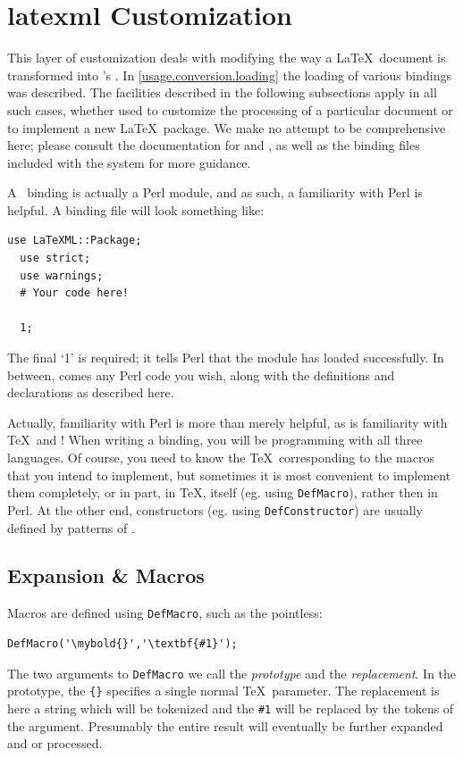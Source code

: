 \documentclass{book}
\newcommand{\ltxcode}{\lstinline[style=latexml]}
\begin{document}
\section{latexml Customization}\label{customization.latexml}
This layer of customization deals with modifying the way a \LaTeX\ document
is transformed into \LaTeXML's \XML.
In \ref{usage.conversion.loading} the loading of various bindings was
described.  The facilities described in the following subsections
apply in all such cases, whether used to customize the processing
of a particular document or to implement a new \LaTeX\ package.
We make no attempt to be comprehensive here; please consult
the documentation for  and ,
as well as the binding files included with the system
for more guidance.

A \LaTeXML\ binding is actually a Perl module, and as such, 
a familiarity with Perl is helpful.
A binding file will look something like:
\begin{lstlisting}[style=latexml]
  use LaTeXML::Package;
  use strict;
  use warnings;
  # Your code here!

  1;
\end{lstlisting}
The final `1' is required; it tells Perl that the module has loaded successfully.
In between, comes any Perl code you wish, along with the definitions
and declarations as described here.

Actually, familiarity with Perl is more than merely helpful, as is familiarity
with \TeX\ and \XML! When writing a binding, you will be programming with all
three languages.  Of course, you need to know the \TeX\ corresponding to
the macros that you intend to implement, but sometimes it is most convenient
to implement them completely, or in part, in \TeX, itself (eg. using \ltxcode|DefMacro|),
rather then in Perl. At the other end, constructors (eg. using \ltxcode|DefConstructor|)
are usually defined by patterns of \XML.

\subsection[Expansion]{Expansion \& Macros}\label{customization.latexml.expansion}
Macros are defined using \texttt{DefMacro}, such as the pointless:
\begin{lstlisting}[style=latexml]
  DefMacro('\mybold{}','\textbf{#1}');
\end{lstlisting}
The two arguments to \texttt{DefMacro} we call
the \emph{prototype} and the \emph{replacement}.
In the prototype, the \verb|{}| specifies a single normal \TeX\ parameter.
The replacement is here a string which will
be tokenized and the \verb|#1| will be replaced by the
tokens of the argument. Presumably the entire result will
eventually be further expanded and or processed.
\end{document}

